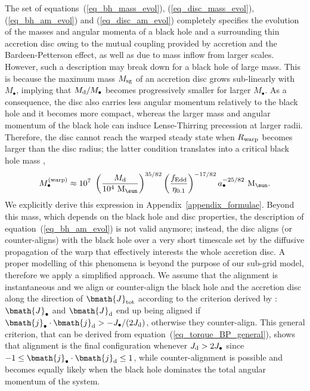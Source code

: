 \documentclass[a4paper,fleqn,usenatbib]{mnras}
\begin{document}
The set of equations~(\ref{eq_bh_mass_evol}), (\ref{eq_disc_mass_evol}), (\ref{eq_bh_am_evol}) and (\ref{eq_disc_am_evol}) completely specifies the evolution of the masses and angular momenta of a black hole and a surrounding thin accretion disc owing to the mutual coupling provided by accretion and the Bardeen-Petterson effect, as well as due to mass inflow from larger scales.
However, such a description may break down for a black hole of large mass.
This is because the maximum mass $M_{\rm sg}$ of an accretion disc grows sub-linearly with $M_{\bullet}$, implying that $M_{\rm d}/M_{\bullet}$ becomes progressively smaller for larger $M_{\bullet}$.
As a consequence, the disc also carries less angular momentum relatively to the black hole and it becomes more compact, whereas the larger mass and angular momentum of the black hole can induce Lense-Thirring precession at larger radii.
Therefore, the disc cannot reach the warped steady state when $R_{\rm warp}$ becomes larger than the disc radius; the latter condition translates into a critical black hole mass \citep{martin+07, dotti+13}, 
\begin{equation} \label{eq_M_warp}
M_{\bullet}^{\rm (warp)} \approx 10^{7}~\left( \frac{M_{\rm d}}{10^4~{\rm M}_{\sun}} \right)^{35 / 82} \left( \frac{f_{\rm Edd}}{\eta_{0.1}} \right)^{-17 / 82} a_{\bullet}^{-25 / 82}~{\rm M}_{\sun}.
\end{equation}
We explicitly derive this expression in Appendix~\ref{appendix_formulae}.
Beyond this mass, which depends on the black hole and disc properties, the description of equation~(\ref{eq_bh_am_evol}) is not valid anymore; instead, the disc aligns (or counter-aligns) with the black hole over a very short timescale set by the diffusive propagation of the warp that effectively interests the whole accretion disc.
A proper modelling of this phenomena is beyond the purpose of our sub-grid model, therefore we apply a simplified approach.
We assume that the alignment is instantaneous and we align or counter-align the black hole and the accretion disc along the direction of $\bmath{J}_{\rm tot}$ according to the criterion derived by \citet{king+05}: $\bmath{J}_{\bullet}$ and $\bmath{J}_{\rm d}$ end up being aligned if $\bmath{j}_{\bullet} \cdot \bmath{j}_{\rm d} > - J_{\bullet} / (2 J_{\rm d})$, otherwise they counter-align.
This general criterion, that can be derived from equation~(\ref{eq_torque_BP_general}), shows that alignment is the final configuration whenever $J_{\rm d} > 2 J_{\bullet}$ since $-1 \leq \bmath{j}_{\bullet} \cdot \bmath{j}_{\rm d} \leq 1$, while counter-alignment is possible and becomes equally likely when the black hole dominates the total angular momentum of the system.
\end{document}
